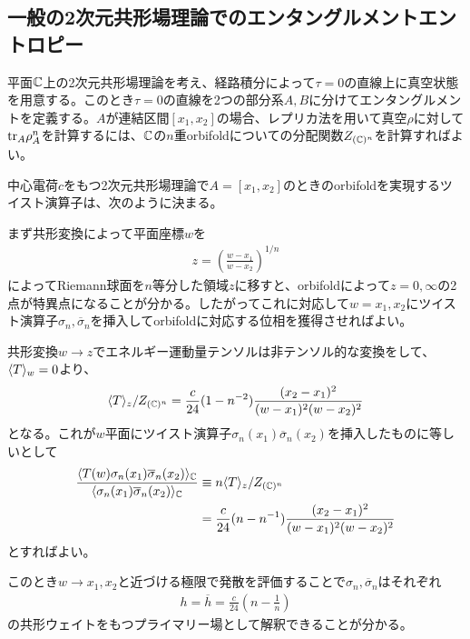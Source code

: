 \subsection{一般の2次元共形場理論でのエンタングルメントエントロピー}
平面$\mathbb{C}$上の2次元共形場理論を考え、経路積分によって$\tau=0$の直線上に真空状態を用意する。このとき$\tau=0$の直線を2つの部分系$A,B$に分けてエンタングルメントを定義する。$A$が連結区間$[x_1,x_2]$の場合、レプリカ法を用いて真空$\rho$に対して$\textnormal{tr}_A \rho_A^n$を計算するには、$\mathbb{C}$の$n$重orbifoldについての分配関数$Z_{(\mathbb{C})^n}$を計算すればよい。

中心電荷$c$をもつ2次元共形場理論で$A=[x_1,x_2]$のときのorbifoldを実現するツイスト演算子は、次のように決まる。

まず共形変換によって平面座標$w$を
\begin{align}
z=\left(\frac{w-x_1}{w-x_2}\right)^{1/n}
\end{align}
によってRiemann球面を$n$等分した領域$z$に移すと、orbifoldによって$z=0,\infty$の2点が特異点になることが分かる。したがってこれに対応して$w=x_1,x_2$にツイスト演算子$\sigma_n,\overline{\sigma}_n$を挿入してorbifoldに対応する位相を獲得させればよい。

共形変換$w\to z$でエネルギー運動量テンソルは非テンソル的な変換をして、$\langle T \rangle_{w}=0$より、
\begin{align}
\langle T \rangle_{z}/Z_{(\mathbb{C})^n}=\frac{c}{24}(1-n^{-2})\frac{(x_2-x_1)^2}{(w-x_1)^2(w-x_2)^2}
\end{align}
となる。これが$w$平面にツイスト演算子$\sigma_n(x_1)\overline{\sigma}_n(x_2)$を挿入したものに等しいとして
\begin{align}
\frac{\langle T(w)\sigma_n(x_1)\overline{\sigma}_n(x_2)\rangle_{\mathbb{C}}}{\langle \sigma_n(x_1)\overline{\sigma}_n(x_2) \rangle_{\mathbb{C}}}&\equiv n\langle T \rangle_{z}/Z_{(\mathbb{C})^n}\\
&=\frac{c}{24}(n-n^{-1})\frac{(x_2-x_1)^2}{(w-x_1)^2(w-x_2)^2}
\end{align}
とすればよい。

このとき$w\to x_1,x_2$と近づける極限で発散を評価することで$\sigma_n,\overline{\sigma}_n$はそれぞれ
\begin{align}
h=\overline{h}=\frac{c}{24}\left(n-\frac{1}{n}\right)
\end{align}
の共形ウェイトをもつプライマリー場として解釈できることが分かる。

